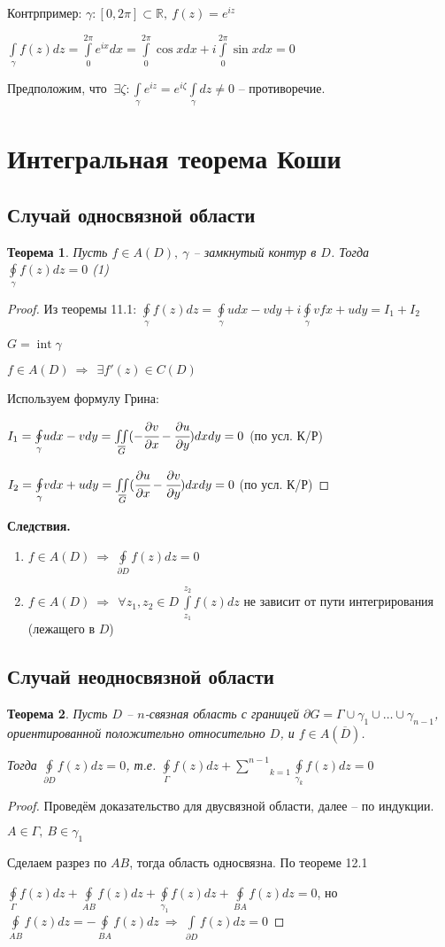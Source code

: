 \documentclass[draft]{report}
\newcommand{\dd}{\partial}
\newcommand{\then}{\ \Rightarrow\ }
\newcommand{\R}{\mathbb{R}}
\newcommand{\mint}[2]{\underset{#1}{\overset{#2}{\int}}}
\newcommand{\moint}[1]{\underset{#1}{\oint}}
\newcommand{\msum}[2]{\underset{#1}{\overset{#2}{\sum}}}
\renewcommand{\bar}{\overline}
\newcommand{\Int}{\mathop{\mathrm{int}}\nolimits}
\newcommand{\g}{\gamma}
\newcommand{\G}{\Gamma}
\newcommand{\E}{\ \exists}
\newcommand{\F}{\ \forall}
\newtheorem*{theor}{Теорема}
\theoremstyle{remark}
\begin{document}
Контрпример: $\g\colon[0,2\pi]\subset\R,\ f(z)=e^{iz}$

$\mint{\g}{}f(z)dz=\mint{0}{2\pi}e^{ix}dx=\mint{0}{2\pi}\cos xdx+i\mint{0}{2\pi}\sin xdx=0$

Предположим, что $\E\zeta\colon\mint{\g}{}e^{iz}=e^{i\zeta}\mint{\g}{}dz\neq0$ -- противоречие.

\section{Интегральная теорема Коши}

\subsection{Случай односвязной области}

\begin{theor}
Пусть $f\in A(D),\ \g$ -- замкнутый контур в $D$. Тогда $\moint\g f(z)dz=0$ (1)
\end{theor}
\begin{proof}
Из теоремы 11.1: $\moint\g f(z)dz=\moint\g udx-vdy+i\moint\g vfx+udy=I_1+I_2$

$G=\Int \g$

$f\in A(D)\then \E f'(z)\in C(D)$

Используем формулу Грина:

$I_1=\moint\g udx-vdy=\underset{\bar{G}}{\iint}(-\cfrac{\dd v}{\dd x}-\cfrac{\dd u}{\dd y})dxdy=0$ (по усл. К/Р)

$I_2=\moint\g vdx+udy=\underset{\bar{G}}{\iint}(\cfrac{\dd u}{\dd x}-\cfrac{\dd v}{\dd y})dxdy=0$ (по усл. К/Р)
\end{proof}

{\bfseries Следствия.}
\begin{enumerate}
\item $f\in A(D)\then\moint{\dd D}f(z)dz=0$
\item $f\in A(D)\then\F z_1,z_2\in D\  \mint{z_1}{z_2}f(z)dz$ не зависит от пути интегрирования (лежащего в $D$)
\end{enumerate}

\subsection{Случай неодносвязной области}

\begin{theor}
Пусть $D$ -- $n$-связная область с границей $\dd G=\G\cup\g_1\cup\ldots\cup\g_{n-1}$, ориентированной положительно относительно $D$, и $f\in A(\bar{D})$. 

Тогда $\moint{\dd D}f(z)dz=0$, т.е. $\moint{\G}f(z)dz+\msum{k=1}{n-1}\moint{\g_k}f(z)dz=0$
\end{theor}
\begin{proof}
Проведём доказательство для двусвязной области, далее -- по индукции.

$A\in\G,\ B\in\g_1$

Сделаем разрез по $AB$, тогда область односвязна. По теореме 12.1

$\moint{\G}f(z)dz+\moint{AB}f(z)dz+\moint{\g_1}f(z)dz+\moint{BA}f(z)dz=0$, но $\moint{AB}f(z)dz=-\moint{BA}f(z)dz\then\mint{\dd D}{}f(z)dz=0$
\end{proof}
\end{document}
